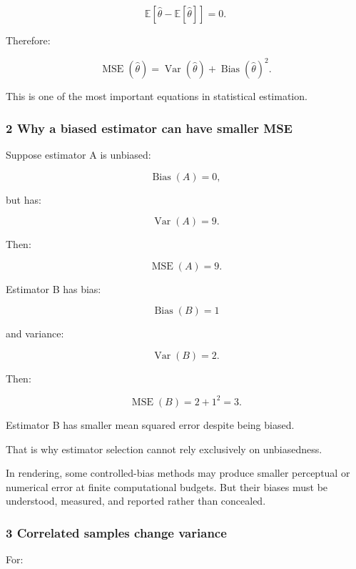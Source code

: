 \[
 \mathbb E[ \widehat\theta-\mathbb E[\widehat\theta] ]=0.
\]

Therefore:

\[
 \boxed{ \operatorname{MSE}(\widehat\theta) = \operatorname{Var}(\widehat\theta) + \operatorname{Bias}(\widehat\theta)^2 }.
\]

This is one of the most important equations in statistical estimation.

\subsubsection{2 Why a biased estimator can have smaller MSE}\label{02-foundations-ii-ch030-why-a-biased-estimator-can-have-smaller-mse}

\hypertarget{02-foundations-ii-ch030-why-a-biased-estimator-can-have-smaller-mse}{}

Suppose estimator A is unbiased:

\[
 \operatorname{Bias}(A)=0,
\]

but has:

\[
 \operatorname{Var}(A)=9.
\]

Then:

\[
 \operatorname{MSE}(A)=9.
\]

Estimator B has bias:

\[
 \operatorname{Bias}(B)=1
\]

and variance:

\[
 \operatorname{Var}(B)=2.
\]

Then:

\[
 \operatorname{MSE}(B)=2+1^2=\boxed3.
\]

Estimator B has smaller mean squared error despite being biased.

That is why estimator selection cannot rely exclusively on unbiasedness.

In rendering, some controlled-bias methods may produce smaller perceptual or numerical error at finite computational budgets. But their biases must be understood, measured, and reported rather than concealed.

\subsubsection{3 Correlated samples change variance}\label{02-foundations-ii-ch030-correlated-samples-change-variance}

\hypertarget{02-foundations-ii-ch030-correlated-samples-change-variance}{}

For:

